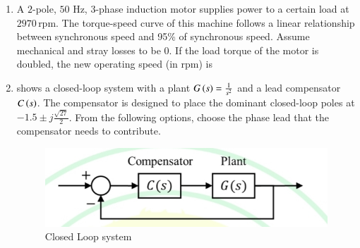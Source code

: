 \documentclass[journal,12pt,onecolumn]{IEEEtran}
\theoremstyle{remark}
\begin{document}
\begin{enumerate}
\item A $2$-pole, $50$ Hz, $3$-phase induction motor supplies power to a certain load at $2970\,\text{rpm}$. The torque-speed curve of this machine follows a linear relationship between synchronous speed and 95\% of synchronous speed. Assume mechanical and stray losses to be $0$. If the load torque of the motor is doubled, the new operating speed (in rpm) is \par\hfill{}
\begin{enumerate}
\end{enumerate}


\item {} shows a closed-loop system with a plant $G\left(s\right)=\tfrac{1}{s^2}$ and a lead compensator $C\left(s\right)$. The compensator is designed to place the dominant closed-loop poles at $-1.5 \pm j\tfrac{\sqrt{27}}{2}$. From the following options, choose the phase lead that the compensator needs to contribute. \par\hfill{}
\begin{figure}[H]
    \centering
    \includegraphics[width=0.5\columnwidth]{Figs/Q-47.jpg}
    \caption{Closed Loop system}
    \label{47}
\end{figure}
\begin{enumerate}
\end{enumerate}



\end{enumerate}
\end{document}
